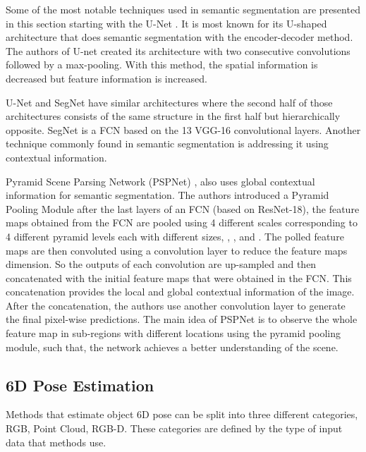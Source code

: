 \documentclass[runningheads]{llncs}
\begin{document}
Some of the most notable techniques used in semantic segmentation are presented in this section starting with the U-Net \cite{unet}.
It is most known for its U-shaped architecture that does semantic segmentation with the encoder-decoder method.
The authors of U-net created its architecture with two consecutive convolutions followed by a max-pooling.
With this method, the spatial information is decreased but feature information is increased.




U-Net and SegNet \cite{segnet} have similar architectures where the second half of those architectures consists of the same structure in the first half but hierarchically opposite.
SegNet is a FCN based on the 13 VGG-16 \cite{VGG16} convolutional layers.
Another technique commonly found in semantic segmentation is addressing it using contextual information.



Pyramid Scene Parsing Network (PSPNet) \cite{pspnet}, also uses global contextual information for semantic segmentation.
The authors introduced a Pyramid Pooling Module after the last layers of an FCN (based on ResNet-18), the feature maps obtained from the FCN are pooled using 4 different scales corresponding to 4 different pyramid levels each with different sizes, , ,  and .
The polled feature maps are then convoluted using a  convolution layer to reduce the feature maps dimension.
So the outputs of each convolution are up-sampled and then concatenated with the initial feature maps that were obtained in the FCN.
This concatenation provides the local and global contextual information of the image.
After the concatenation, the authors use another convolution layer to generate the final pixel-wise predictions.
The main idea of PSPNet is to observe the whole feature map in sub-regions with different locations using the pyramid pooling module, such that, the network achieves a better understanding of the scene.

\subsection{6D Pose Estimation}
\label{sub:6d}
Methods that estimate object 6D pose can be split into three different categories, RGB, Point Cloud, RGB-D.
These categories are defined by the type of input data that methods use.
\end{document}

